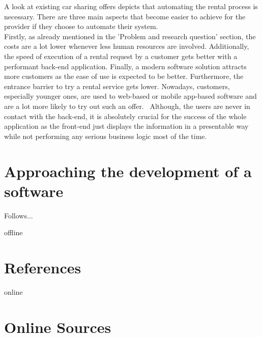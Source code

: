 \documentclass[12pt,a4paper]{report}
\begin{document}
A look at existing car sharing offers depicts that automating the rental process
is necessary. There are three main aspects that become easier to achieve for the
provider if they choose to automate their system.\\
Firstly, as already mentioned in the 'Problem and research question' section,
the costs are a lot lower whenever less human resources are involved.
Additionally, the speed of execution of a rental request by a customer gets better
with a performant back-end application.
Finally, a modern software solution attracts more customers as the ease of use
is expected to be better. Furthermore, the entrance barrier to try a rental service
gets lower. Nowadays, customers, especially younger ones, are used to web-based
or mobile app-based software and are a lot more likely to try out such an offer.~\cn
Although, the users are never in contact with the back-end, it is absolutely
crucial for the success of the whole application as the front-end just displays
the information in a presentable way while not performing any serious
business logic most of the time.


\section{Approaching the development of a software}

Follows...



\newpage



\begin{btSect}{offline}
\section*{References}
\btPrintCited
\end{btSect}
\begin{btSect}{online}
\section*{Online Sources}
\btPrintCited
\end{btSect}
\end{document}
